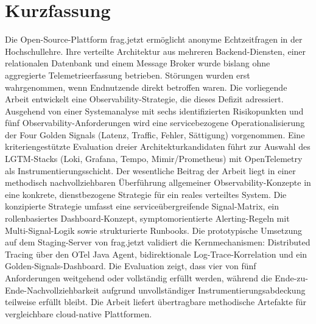 

\chapter*{Kurzfassung}

\begingroup
\setlength{\parskip}{0.5em}
Die Open-Source-Plattform frag.jetzt ermöglicht anonyme Echtzeitfragen in der Hochschullehre. Ihre verteilte Architektur aus mehreren Backend-Diensten, einer relationalen Datenbank und einem Message Broker wurde bislang ohne aggregierte Telemetrieerfassung betrieben. Störungen wurden erst wahrgenommen, wenn Endnutzende direkt betroffen waren. Die vorliegende Arbeit entwickelt eine Observability-Strategie, die dieses Defizit adressiert. Ausgehend von einer Systemanalyse mit sechs identifizierten Risikopunkten und fünf Observability-Anforderungen wird eine servicebezogene Operationalisierung der Four Golden Signals (Latenz, Traffic, Fehler, Sättigung) vorgenommen. Eine kriteriengestützte Evaluation dreier Architekturkandidaten führt zur Auswahl des LGTM-Stacks (Loki, Grafana, Tempo, Mimir/Prometheus) mit OpenTelemetry als Instrumentierungsschicht. Der wesentliche Beitrag der Arbeit liegt in einer methodisch nachvollziehbaren Überführung allgemeiner Observability-Konzepte in eine konkrete, dienstbezogene Strategie für ein reales verteiltes System. Die konzipierte Strategie umfasst eine serviceübergreifende Signal-Matrix, ein rollenbasiertes Dashboard-Konzept, symptomorientierte Alerting-Regeln mit Multi-Signal-Logik sowie strukturierte Runbooks. Die prototypische Umsetzung auf dem Staging-Server von frag.jetzt validiert die Kernmechanismen: Distributed Tracing über den OTel Java Agent, bidirektionale Log-Trace-Korrelation und ein Golden-Signals-Dashboard. Die Evaluation zeigt, dass vier von fünf Anforderungen weitgehend oder vollständig erfüllt werden, während die Ende-zu-Ende-Nachvollziehbarkeit aufgrund unvollständiger Instrumentierungsabdeckung teilweise erfüllt bleibt. Die Arbeit liefert übertragbare methodische Artefakte für vergleichbare cloud-native Plattformen.

